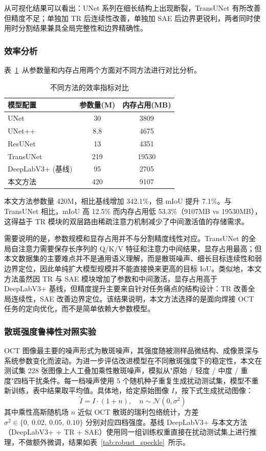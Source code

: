 从可视化结果可以看出：UNet 系列在细长结构上出现断裂，TransUNet 有所改善但精度不足；单独加 TR 后连续性改善，单独加 SAE 后边界更锐利，两者同时使用时分割结果兼具全局完整性和边界精确性。

\subsubsection{效率分析}

表~\ref{tab:efficiency}~从参数量和内存占用两个方面对不同方法进行对比分析。

\begin{table}[htbp]
\centering
\caption{不同方法的效率指标对比}
\label{tab:efficiency}
\begin{tabular}{lcc}
\toprule
模型配置 & 参数量(M) & 内存占用(MB) \\
\midrule
UNet & 30 & 3809 \\
UNet++ & 8.8 & 4675 \\
ResUNet & 13 & 4351 \\
TransUNet & 219 & 19530 \\
DeepLabV3+ (基线) & 95 & 2705 \\
本文方法 & 420 & 9107 \\
\bottomrule
\end{tabular}
\end{table}

本文方法参数量 420M，相比基线增加 342.1\%，但 mIoU 提升 7.1\%。与 TransUNet 相比，mIoU 高 12.5\% 而内存占用低 53.3\%（9107MB vs 19530MB），这得益于 TR 模块的双层路由稀疏注意力机制减少了中间激活值的存储需求。

需要说明的是，参数规模和显存占用并不与分割精度线性对应。TransUNet 的全局自注意力需要保存长序列的 Q/K/V 特征和注意力中间结果，显存占用最高；但本文数据集的主要难点并不是通用语义理解，而是散斑噪声、细长目标连续性和弱边界定位，因此单纯扩大模型规模并不能直接换来更高的目标 IoU。类似地，本文方法虽然因 TR 与 SAE 模块增加了参数和中间激活，显存占用高于 DeepLabV3+ 基线，但精度提升主要来自针对任务痛点的结构设计：TR 改善全局连续性，SAE 改善边界定位。该结果说明，本文方法选择的是面向焊接 OCT 任务的定向优化，而不是简单依赖大参数模型。

\subsubsection{散斑强度鲁棒性对照实验}

OCT 图像最主要的噪声形式为散斑噪声，其强度随被测样品微结构、成像景深与系统参数变化而波动。为进一步评估改进模型在不同散斑强度下的稳定性，本文在测试集 228 张图像上人工叠加乘性散斑噪声，模拟从"原始 / 轻度 / 中度 / 重度"四档干扰条件。每一档噪声使用 5 个随机种子重复生成扰动测试集，模型不重新训练，表中结果取平均值。具体地，给定原始图像 $I$，按下式生成扰动图像：
\begin{equation}
\tilde{I} = I \cdot (1 + n), \quad n \sim \mathcal{N}(0, \sigma^2)
\end{equation}
其中乘性高斯随机场 $n$ 近似 OCT 散斑的瑞利包络统计，方差 $\sigma^2 \in \{0,\ 0.02,\ 0.05,\ 0.10\}$ 分别对应四档强度。基线 DeepLabV3+ 与本文方法（DeepLabV3+ + TR + SAE）使用同一组训练权重直接在扰动测试集上进行推理，不做额外微调，结果如表~\ref{tab:robust_speckle}~所示。

